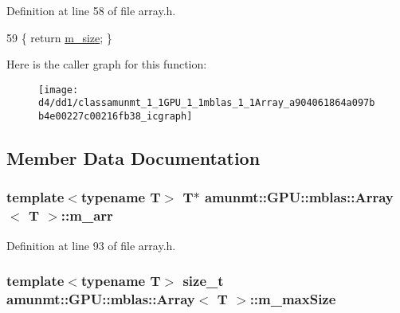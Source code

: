Definition at line 58 of file array.\+h.


\begin{DoxyCode}
59   \{ \textcolor{keywordflow}{return} \hyperlink{classamunmt_1_1GPU_1_1mblas_1_1Array_aa90aef4140b4b8b7a280a12cfb5d18be}{m\_size}; \}
\end{DoxyCode}


Here is the caller graph for this function\+:
\nopagebreak
\begin{figure}[H]
\begin{center}
\leavevmode
\texttt{[image: d4/dd1/classamunmt\_1\_1GPU\_1\_1mblas\_1\_1Array\_a904061864a097bb4e00227c00216fb38\_icgraph]}
\end{center}
\end{figure}




\subsection{Member Data Documentation}
\subsubsection[{\texorpdfstring{m\+\_\+arr}{m_arr}}]{\setlength{\rightskip}{0pt plus 5cm}template$<$typename T$>$ T$\ast$ {\bf amunmt\+::\+G\+P\+U\+::mblas\+::\+Array}$<$ T $>$\+::m\+\_\+arr\hspace{0.3cm}{\ttfamily [protected]}}\hypertarget{classamunmt_1_1GPU_1_1mblas_1_1Array_a7a39c49fc1d3ab24dcc5351331e39d80}{}\label{classamunmt_1_1GPU_1_1mblas_1_1Array_a7a39c49fc1d3ab24dcc5351331e39d80}


Definition at line 93 of file array.\+h.

\subsubsection[{\texorpdfstring{m\+\_\+max\+Size}{m_maxSize}}]{\setlength{\rightskip}{0pt plus 5cm}template$<$typename T$>$ size\+\_\+t {\bf amunmt\+::\+G\+P\+U\+::mblas\+::\+Array}$<$ T $>$\+::m\+\_\+max\+Size\hspace{0.3cm}{\ttfamily [protected]}}\hypertarget{classamunmt_1_1GPU_1_1mblas_1_1Array_a7772744da8b22a846d993f8a7dd42b50}{}\label{classamunmt_1_1GPU_1_1mblas_1_1Array_a7772744da8b22a846d993f8a7dd42b50}


